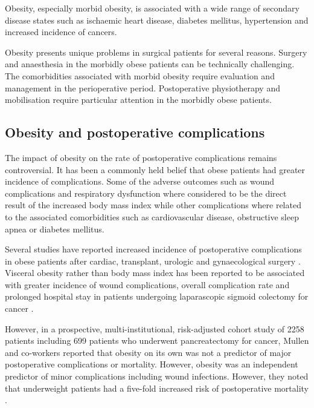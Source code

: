 Obesity, especially morbid obesity, is associated with a wide range of secondary disease states such as ischaemic heart disease, diabetes mellitus, hypertension and increased incidence of cancers. 

Obesity presents unique problems in surgical patients for several reasons. 
Surgery and anaesthesia in the morbidly obese patients can be technically challenging. 
The comorbidities associated with morbid obesity require evaluation and management in the perioperative period. 
Postoperative physiotherapy and mobilisation require particular attention in the morbidly obese patients. 

\subsection{Obesity and postoperative complications}

The impact of obesity on the rate of postoperative complications remains controversial. 
It has been a commonly held belief that obese patients had greater incidence of complications. 
Some of the adverse outcomes such as wound complications and respiratory dysfunction where considered to be the direct result of the increased body mass index while other complications where related to the associated comorbidities such as cardiovascular disease, obstructive sleep apnea or diabetes mellitus. 

Several studies have reported increased incidence of postoperative complications in obese patients after cardiac, transplant, urologic and gynaecological surgery \parencite{prem_operative_1965, holley_obesity_1990, fasol_influence_1992, gruberg_impact_2002, lee_impact_2004}. 
Visceral obesity rather than body mass index has been reported to be associated with greater incidence of wound complications, overall complication rate and prolonged hospital stay in patients undergoing laparascopic sigmoid colectomy for cancer  \parencite{tsujinaka_visceral_2008}.

However, in a prospective, multi-institutional, risk-adjusted cohort study of 2258 patients including 699 patients who underwent pancreatectomy for cancer, Mullen and co-workers reported that obesity on its own was not a predictor of major postoperative complications or mortality. 
However, obesity was an independent predictor of minor complications including wound infections. 
However, they noted that underweight patients had a five-fold increased risk of postoperative mortality \parencite{mullen_impact_2008}.

